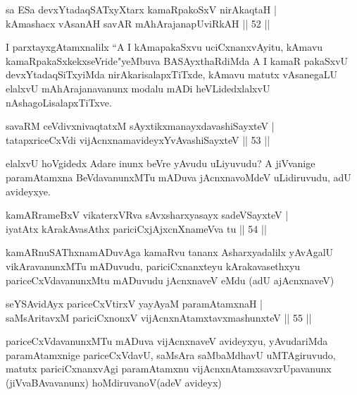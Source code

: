 \begin{shl}
sa ESa devxYtadaqSATxyX\s tarx kamaRpakoSxV nirAkaqtaH |\\
kAmashacx vAsanAH savAR mAhArajanapUviRkAH \hfill || 52 ||
\end{shl}

\begin{artha}
I parxtayxgAtamxnalilx ``A I kAmapakaSxvu uciCxnanxvAyitu, kAmavu kamaRpakaSxkekxseVride"yeMbuva BASAyxthaRdiMda A I kamaR pakaSxvU devxYtadaqSiTxyiMda nirAkarisalapxTiTxde, kAmavu matutx vAsanegaLU elalxvU mAhArajanavanunx modalu mADi heVLidedxlalxvU nAshagoLisalapxTiTxve.
\end{artha}

\begin{shl}
savaRM ceVdivxnivaqtatxM sAyxtikxmanayxdavashiSayxteV |\\
tatapxriceCxVdi vijAcnxnamavideyxYvAvashiSayxteV \hfill || 53 ||
\end{shl}

\begin{artha}
elalxvU hoVgidedx Adare inunx beVre yAvudu uLiyuvudu? A jiVvanige paramAtamxna BeVdavanunxMTu  mADuva jAcnxnavoMdeV uLidiruvudu, adU avideyxye.
\end{artha}

\begin{shl}
kamAR\s \s rameBxV vikaterxVRva sAvxsharxyasayx sadeVSayxteV |\\
iyatAtx kArakAvasAthx pariciCxjAjxcnXnameVva tu \hfill || 54 ||
\end{shl}

\begin{artha}
kamARnuSAThxnamADuvAga kamaRvu tananx Asharxyadalilx yAvAgalU vikAravanunxMTu mADuvudu, pariciCxnanxteyu kArakavasethxyu pariceCxVdavanunxMtu mADuvudu jAcnxnaveV eMdu (adU ajAcnxnaveV)
\end{artha}


\begin{shl}
seYSA\s vidAyx pariceCxVtirxV yayA\s yaM paramAtamxnaH |\\
saMsAritavxM pariciCxnonxV vijAcnxnAtamxtavxmashunxteV \hfill || 55 ||
\end{shl}

\begin{artha}
pariceCxVdavanunxMTu mADuva vijAcnxnaveV avideyxyu, yAvudariMda paramAtamxnige 
pariceCxVdavU, saMsAra saMbaMdhavU uMTAgiruvudo, matutx pariciCxnanxvAgi paramAtamxnu 
vijAcnxnAtamxsavxrUpavanunx (jiVvaBAvavanunx) hoMdiruvanoV(adeV avideyx)
\end{artha}

